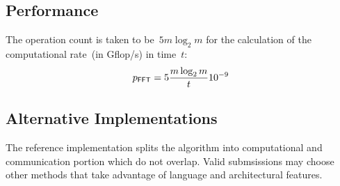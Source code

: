\documentclass[twocolumn,draft]{article}
\newcommand{\fft}{\textsf{\scriptsize FFT}\xspace}
\begin{document}
\subsection{Performance}
The operation count is taken to be~$5m\log_2 m$ for the calculation of the
computational rate~(in Gflop/s) in time~$t$:
\begin{equation}
  p_{\fft}=5\frac{m\log_2 m}{t}10^{-9}
\end{equation}

\subsection{Alternative Implementations}
The reference implementation splits the algorithm into computational and
communication portion which do not overlap. Valid submsissions may choose other
methods that take advantage of language and architectural features.
\end{document}
